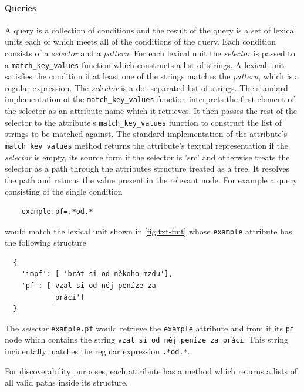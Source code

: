 \documentclass[10pt, a4paper]{article}
\newcommand{\py}[1]{{\tt #1}}
\newcommand{\att}[1]{{\tt #1}}
\begin{document}
\paragraph{Queries} A query is a collection of conditions
and the result of the query is a set of lexical units each of which meets all
of the conditions of the query. Each condition consists of a \emph{selector} and a
\emph{pattern}. For each lexical unit the \emph{selector} is passed to a \py{match\_key\_values}
function which constructs a list of strings. A lexical unit satisfies the condition if at
least one of the strings matches the \emph{pattern}, which is a regular expression.
The \emph{selector} is a dot-separated list of strings. The standard implementation of the
\py{match\_key\_values} function interprets the first element of the selector as an attribute
name which it retrieves. It then passes the rest of the selector to the attribute's \py{match\_key\_values}
function to construct the list of strings to be matched against. The standard implementation
of the attribute's \py{match\_key\_values} method returns the attribute's textual representation
if the \emph{selector} is empty, its source form if the selector is 'src' and otherwise treats
the selector as a path through the attributes structure treated as a tree. It resolves the path and returns the
value present in the relevant node. For example a query consisting of the single condition
\begin{verbatim}
    example.pf=.*od.*
\end{verbatim}
would match the lexical unit shown in \autoref{fig:txt-fmt} whose \att{example} attribute
has the following structure
\begin{verbatim}
  {
    'impf': [ 'brát si od někoho mzdu'],
    'pf': ['vzal si od něj peníze za
            práci']
  }
\end{verbatim}
The \emph{selector} \att{example.pf} would retrieve the \att{example} attribute and from it
its \att{pf} node which contains the string {\tt vzal si od něj peníze za práci}. This string
incidentally matches the regular expression {\tt .*od.*}.

For discoverability purposes, each attribute has a method which returns a lists of all valid paths
inside its structure.
\end{document}
